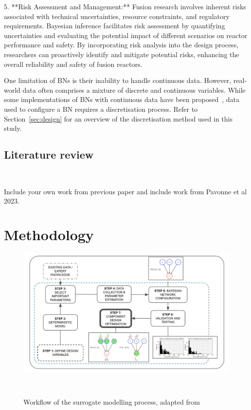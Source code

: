 \documentclass[journal]{IEEEtran}
\begin{document}
5. **Risk Assessment and Management:** Fusion research involves inherent risks associated with technical uncertainties, resource constraints, and regulatory requirements. Bayesian inference facilitates risk assessment by quantifying uncertainties and evaluating the potential impact of different scenarios on reactor performance and safety. By incorporating risk analysis into the design process, researchers can proactively identify and mitigate potential risks, enhancing the overall reliability and safety of fusion reactors.

One limitation of BNs is their inability to handle continuous data. However, real-world data often comprises a mixture of discrete and continuous variables. While some implementations of BNs with continuous data have been proposed~\cite{Cobb2007,Chen2017,Li2018}, data used to configure a BN requires a discretisation process. Refer to Section~\ref{sec:design} for an overview of the discretisation method used in this study.

\subsection{Literature review}~\label{sec:background}

Include your own work from previous paper and include work from Pavonne et al 2023. 

\section{Methodology}\label{sec:methodology}

\begin{figure}[t]
    \centering
    \includegraphics[width=\textwidth]{figures/workflow_v4.png}
    \caption{Workflow of the surrogate modelling process, adapted from~\cite{Conti2019}}~\label{fig:workflow}
\end{figure}
\end{document}
